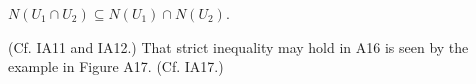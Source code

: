 $N(U_1 \cap U_2) \subseteq N(U_1) \cap N(U_2)$.

(Cf. IA11 and IA12.) That strict inequality may hold in A16 is seen by the example in Figure A17. (Cf. IA17.)
